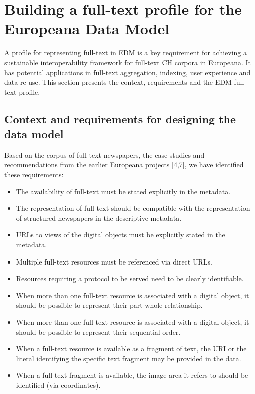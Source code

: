 \documentclass[a4paper,UKenglish,cleveref, autoref]{oasics-v2019}
\begin{document}
\section{Building a full-text profile for the Europeana Data Model}
\label{sec:buildingfulltextprofile}

A profile for representing full-text in EDM is a key requirement for achieving a sustainable interoperability framework for full-text CH corpora in Europeana. It has potential applications in full-text aggregation, indexing, user experience and data re-use. This section presents the context, requirements and the EDM full-text profile.

\subsection{Context and requirements for designing the data model}
\label{sec:contextandrequirements}

Based on the corpus of full-text newspapers, the case studies and recommendations from the earlier Europeana projects [4,7], we have identified these requirements:
\begin{itemize}
\item The availability of full-text must be stated explicitly in the metadata.
\item The representation of full-text should be compatible with the representation of structured newspapers in the descriptive metadata.
\item URLs to views of the digital objects must be explicitly stated in the metadata.
\item Multiple full-text resources must be referenced via direct URLs. 
\item Resources requiring a protocol to be served need to be clearly identifiable.
\item When more than one full-text resource is associated with a digital object, it should be possible to represent their part-whole relationship. 
\item When more than one full-text resource is associated with a digital object, it should be possible to represent their sequential order. 
\item When a full-text resource is available as a fragment of text, the URI or the literal identifying the specific text fragment may be provided in the data.
\item When a full-text fragment is available, the image area it refers to should be identified (via coordinates).
\end{itemize}
\end{document}
